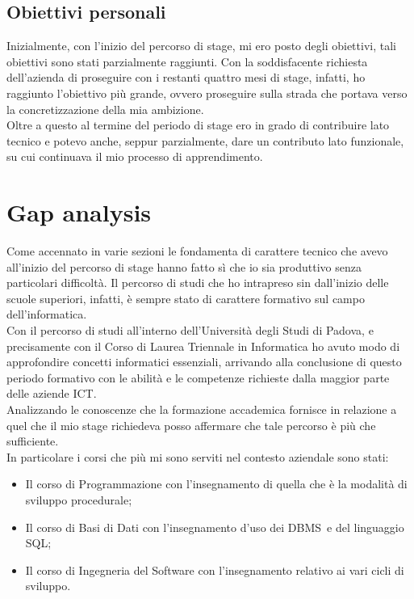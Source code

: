 \subsection{Obiettivi personali}
Inizialmente, con l'inizio del percorso di stage, mi ero posto degli obiettivi, tali obiettivi sono stati parzialmente raggiunti. Con la soddisfacente richiesta dell'azienda di proseguire con i restanti quattro mesi di stage, infatti, ho raggiunto l'obiettivo più grande, ovvero proseguire sulla strada che portava verso la concretizzazione della mia ambizione.\\

Oltre a questo al termine del periodo di stage ero in grado di contribuire lato tecnico e potevo anche, seppur parzialmente, dare un contributo lato funzionale, su cui continuava il mio processo di apprendimento.

\section{Gap analysis}

Come accennato in varie sezioni le fondamenta di carattere tecnico che avevo all'inizio del percorso di stage hanno fatto sì che io sia produttivo senza particolari difficoltà. Il percorso di studi che ho intrapreso sin dall'inizio delle scuole superiori, infatti, è sempre stato di carattere formativo sul campo dell'informatica.\\

Con il percorso di studi all'interno dell'Università degli Studi di Padova, e precisamente con il Corso di Laurea Triennale in Informatica ho avuto modo di approfondire concetti informatici essenziali, arrivando alla conclusione di questo periodo formativo con le abilità e le competenze richieste dalla maggior parte delle aziende ICT.\\

Analizzando le conoscenze che la formazione accademica fornisce in relazione a quel che il mio stage richiedeva posso affermare che tale percorso è più che sufficiente.\\

In particolare i corsi che più mi sono serviti nel contesto aziendale sono stati: 
\begin{itemize}
	\item Il corso di Programmazione con l'insegnamento di quella che è la modalità di sviluppo procedurale;
	\item Il corso di Basi di Dati con l'insegnamento d'uso dei DBMS\glossario\ e del linguaggio SQL;
	\item Il corso di Ingegneria del Software con l'insegnamento relativo ai vari cicli di sviluppo.
\end{itemize}

